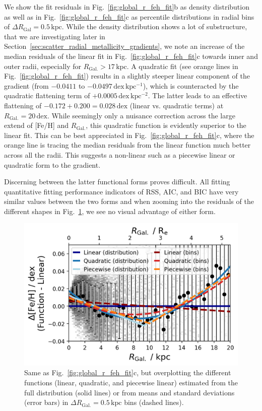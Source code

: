 \documentclass[fleqn,usenatbib]{mnras}
\begin{document}
We show the fit residuals in Fig.~\ref{fig:global_r_feh_fit}b as density distribution as well as in Fig.~\ref{fig:global_r_feh_fit}c as percentile distributions in radial bins of $\Delta R_\mathrm{Gal} = 0.5\,\mathrm{kpc}$. While the density distribution shows a lot of substructure, that we are investigating later in Section~\ref{sec:scatter_radial_metallicity_gradients}, we note an increase of the median residuals of the linear fit in Fig.~\ref{fig:global_r_feh_fit}c towards inner and outer radii, especially for $R_\mathrm{Gal.} > 17\,\mathrm{kpc}$. A quadratic fit (see orange lines in Fig.~\ref{fig:global_r_feh_fit}) results in a slightly steeper linear component of the gradient (from $-0.0411$ to $-0.0497\,\mathrm{dex\,kpc^{-1}}$), which is counteracted by the quadratic flattening term of $+0.0005\,\mathrm{dex\,kpc^{-2}}$. The latter leads to an effective flattening of $-0.172 + 0.200 = 0.028\,\mathrm{dex}$ (linear vs. quadratic terms) at $R_\mathrm{Gal.} = 20\,\mathrm{dex}$. While seemingly only a nuisance correction across the large extend of [Fe/H] and $R_\mathrm{Gal.}$, this quadratic function is evidently superior to the linear fit. This can be best appreciated in Fig.~\ref{fig:global_r_feh_fit}c, where the orange line is tracing the median residuals from the linear function much better across all the radii. This suggests a non-linear such as a piecewise linear or quadratic form to the gradient.

Discerning between the latter functional forms proves difficult. All fitting quantitative fitting performance indicators of RSS, AIC, and BIC have very similar values between the two forms and when zooming into the residuals of the different shapes in Fig.~\ref{fig:linear_quadratic_piecewise}, we see no visual advantage of either form.

\begin{figure}
    \centering
    \includegraphics[width=\columnwidth]{figures/linear_quadratic_piecewise.png}
    \caption{Same as Fig.~\ref{fig:global_r_feh_fit}c, but overplotting the different functions (linear, quadratic, and piecewise linear) estimated from the full distribution (solid lines) or from means and standard deviations (error bars) in $\Delta R_\mathrm{Gal.} = 0.5\,\mathrm{kpc}$ bins (dashed lines).}
    \label{fig:linear_quadratic_piecewise}
\end{figure}
\end{document}
